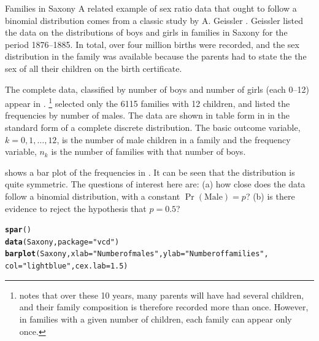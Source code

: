\documentclass[11pt]{book}\usepackage[]{graphicx}\usepackage[]{color}
\makeatletter
\newcommand{\hlnum}[1]{\textcolor[rgb]{0.686,0.059,0.569}{#1}}%
\newcommand{\hlstr}[1]{\textcolor[rgb]{0.192,0.494,0.8}{#1}}%
\newcommand{\hlstd}[1]{\textcolor[rgb]{0.345,0.345,0.345}{#1}}%
\newcommand{\hlkwc}[1]{\textcolor[rgb]{0.333,0.667,0.333}{#1}}%
\newcommand{\hlkwd}[1]{\textcolor[rgb]{0.737,0.353,0.396}{\textbf{#1}}}%
\newenvironment{kframe}{%
 \def\at@end@of@kframe{}%
 \ifinner\ifhmode%
  \def\at@end@of@kframe{\end{minipage}}%
  \begin{minipage}{\columnwidth}%
 \fi\fi%
 \def\FrameCommand##1{\hskip\@totalleftmargin \hskip-\fboxsep
 \colorbox{shadecolor}{##1}\hskip-\fboxsep
     \hskip-\linewidth \hskip-\@totalleftmargin \hskip\columnwidth}%
 \MakeFramed {\advance\hsize-\width
   \@totalleftmargin\z@ \linewidth\hsize
   \@setminipage}}%
 {\par\unskip\endMakeFramed%
 \at@end@of@kframe}
\newenvironment{knitrout}{}{} %
\renewenvironment{knitrout}{\small\renewcommand{\baselinestretch}{.85}}{} %
\makeatother
\begin{document}
\begin{Example}[saxony1]{Families in Saxony}
A related example of sex ratio data that ought to follow a binomial distribution
comes from a classic study by A. Geissler \citeyearpar{Geissler:1889}.
Geissler listed the data on the distributions of boys and girls in families
in Saxony for the period 1876--1885. In total, over four million births were
recorded, and the sex distribution in the family was available because the parents had to state the the sex of all their children on
the birth certificate.%

The complete data, classified by number of boys and number of girls
(each 0--12) appear in \citet[Table 1]{Edwards:1958}.%
\footnote{
\citet{Edwards:1958} notes that over these 10 years, many parents
will have had several children, and their family composition 
is therefore recorded more than once.  However, in families with a given
number of children, each family can appear only once.
}
\citet[Table 6.2]{Lindsey:95} selected only the 6115 families with 
12 children, and listed the frequencies by number of males.  The
data are shown in table form in  in the standard form
of a complete discrete distribution.  The basic outcome variable, 
$k = 0, 1, \dots, 12$, is the number of male children in a family
and the frequency variable, $n_k$ is the number of families with that
number of boys.



 shows a bar plot of the frequencies in .
It can be seen that the distribution is quite symmetric.  The questions of interest
here are: 
(a) how close does the data follow a binomial distribution, with a constant
$\Pr(\mathrm{Male}) = p$?
(b) is there evidence to reject the hypothesis that $ p = 0.5$?

\begin{knitrout}
\color{fgcolor}\begin{kframe}
\begin{alltt}
\hlkwd{spar}\hlstd{()}
\hlkwd{data}\hlstd{(Saxony,} \hlkwc{package}\hlstd{=}\hlstr{"vcd"}\hlstd{)}
\hlkwd{barplot}\hlstd{(Saxony,} \hlkwc{xlab}\hlstd{=}\hlstr{"Number of males"}\hlstd{,} \hlkwc{ylab}\hlstd{=}\hlstr{"Number of families"}\hlstd{,}
        \hlkwc{col}\hlstd{=}\hlstr{"lightblue"}\hlstd{,} \hlkwc{cex.lab}\hlstd{=}\hlnum{1.5}\hlstd{)}
\end{alltt}
\end{kframe}\begin{figure}[htbp]



\end{figure}
\end{knitrout}
\end{Example}
\end{document}

